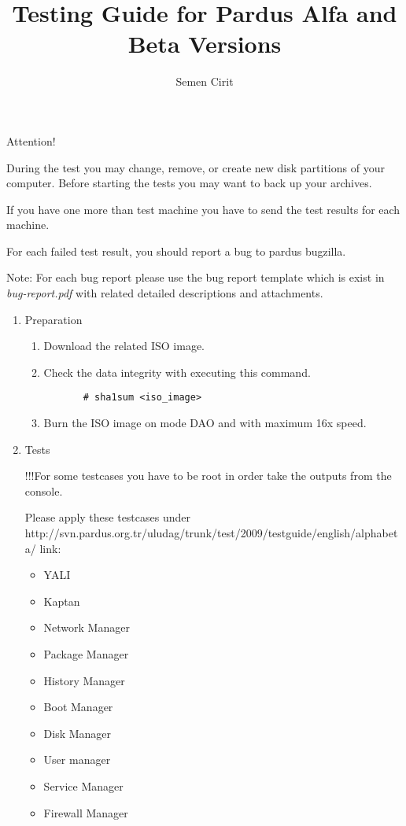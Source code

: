 \documentclass[a4paper,10pt]{article}
\title{Testing Guide for Pardus Alfa and Beta Versions}
\author{Semen Cirit}
\begin{document}
\maketitle

Attention!

    During the test you may change, remove, or create new disk partitions of your computer. 
    Before starting the tests you may want to back up your archives.
    
    If you have one more than test machine you have to send the test results for each machine.

    For each failed test result, you should report a bug to pardus bugzilla.

    Note: For each bug report please use the bug report template which is exist in \emph{bug-report.pdf} with related detailed descriptions and attachments.

\begin{enumerate}
\item Preparation
  \begin{enumerate}
    \item Download the related ISO image.
    \item Check the data integrity with executing this command.
      \begin{verbatim}
       # sha1sum <iso_image>
      \end{verbatim}
    \item Burn the ISO image on mode DAO and with maximum 16x speed.
  \end{enumerate}
  \item Tests
    
 	!!!For some testcases you have to be root in order take the outputs from the console.
	
    Please apply these testcases under http://svn.pardus.org.tr/uludag/trunk/test/2009/testguide/english/alphabeta/ link:
    \begin{itemize}
    \item YALI
    \item Kaptan
    \item Network Manager
    \item Package Manager
    \item History Manager
    \item Boot Manager
    \item Disk Manager
    \item User manager
    \item Service Manager
    \item Firewall Manager
    \end{itemize}
 \end{enumerate}
\end{document}
